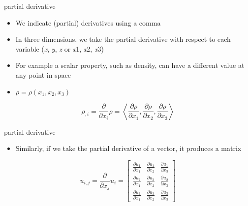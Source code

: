 \documentclass[
  letterpaper,
  ignorenonframetext,
  aspectratio=43,
  handout,
  12pt]{beamer}
\providecommand{\tightlist}{%
  \setlength{\itemsep}{0pt}\setlength{\parskip}{0pt}}
\providecommand{\tightlist}{%
\setlength{\itemsep}{0pt}\setlength{\parskip}{0pt}}
\begin{document}
\begin{frame}{partial derivative}
\protect\hypertarget{partial-derivative}{}
\begin{itemize}
\tightlist
\item
  We indicate (partial) derivatives using a comma
\item
  In three dimensions, we take the partial derivative with respect to
  each variable (\emph{x}, \emph{y}, \emph{z} or \emph{x}1, \emph{x}2,
  \emph{x}3)
\item
  For example a scalar property, such as density, can have a different
  value at any point in space
\item
  \(\rho = \rho(x_1, x_2, x_3)\)
\end{itemize}

\[\rho_{,i} = \frac{\partial}{\partial x_i} \rho = \left\langle \frac{\partial \rho }{\partial x_1}, \frac{\partial \rho }{\partial x_2}, \frac{\partial \rho }{\partial x_3} \right\rangle\]
\end{frame}

\begin{frame}{partial derivative}
\protect\hypertarget{partial-derivative-1}{}
\begin{itemize}
\tightlist
\item
  Similarly, if we take the partial derivative of a vector, it produces
  a matrix
\end{itemize}

\[u_{i,j} = \frac{\partial}{\partial x_j} u_i = \begin{bmatrix}
\frac{\partial u_1}{\partial x_1} & \frac{\partial u_1}{\partial x_2} & \frac{\partial u_1}{\partial x_3}\\
\frac{\partial u_2}{\partial x_1} & \frac{\partial u_2}{\partial x_2} & \frac{\partial u_2}{\partial x_3}\\
\frac{\partial u_3}{\partial x_1} & \frac{\partial u_3}{\partial x_2} & \frac{\partial u_3}{\partial x_3}
\end{bmatrix}\]
\end{frame}
\end{document}
